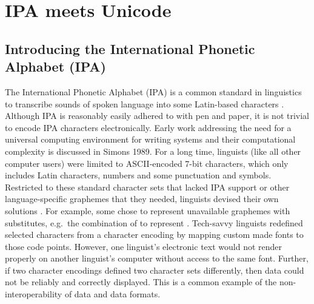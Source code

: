 \chapter{IPA meets Unicode} \label{ipa-meets-unicode}

\section{Introducing the International Phonetic Alphabet (IPA)}
\label{introducing-the-international-phonetic-alphabet-ipa}

The International Phonetic Alphabet (IPA) is a common standard in linguistics to
transcribe sounds of spoken language into some Latin-based characters
\citep{IPA2005}. Although IPA is reasonably easily adhered to with pen and
paper, it is not trivial to encode IPA characters electronically. Early work
addressing the need for a universal computing environment for writing systems
and their computational complexity is discussed in Simons 1989. For a long time,
linguists (like all other computer users) were limited to ASCII-encoded 7-bit
characters, which only includes Latin characters, numbers and some punctuation
and symbols. Restricted to these standard character sets that lacked IPA support
or other language-specific graphemes that they needed, linguists devised their
own solutions \citep{BirdSimons2003}. For example, some chose to represent
unavailable graphemes with substitutes, e.g.~the combination of to represent .
Tech-savvy linguists redefined selected characters from a character encoding by
mapping custom made fonts to those code points. However, one linguist's
electronic text would not render properly on another linguist's computer without
access to the same font. Further, if two character encodings defined two
character sets differently, then data could not be reliably and correctly
displayed. This is a common example of the non-interoperability of data and data
formats.

